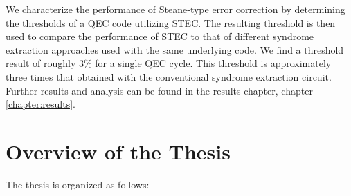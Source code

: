 We characterize the performance of Steane-type error correction by determining the thresholds of a QEC code utilizing STEC.
The resulting threshold is then used to compare the performance of STEC to that of different syndrome extraction approaches used with the same underlying code.
We find a threshold result of roughly $3\%$ for a single QEC cycle. 
This threshold is approximately three times that obtained with the conventional syndrome extraction circuit.
Further results and analysis can be found in the results chapter, chapter \ref{chapter:results}. 

\section{Overview of the Thesis}


The thesis is organized as follows:
